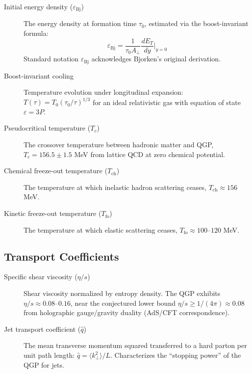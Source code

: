 \documentclass[11pt]{article}
\begin{document}
\begin{description}
\item[Initial energy density ($\varepsilon_{\mathrm{Bj}}$)] The energy density at formation time $\tau_0$, estimated via the boost-invariant formula:
\begin{equation*}
\varepsilon_{\mathrm{Bj}} = \frac{1}{\tau_0 A_\perp} \frac{dE_T}{dy}\bigg|_{y=0}
\end{equation*}
Standard notation $\varepsilon_{\mathrm{Bj}}$ acknowledges Bjorken's original derivation.

\item[Boost-invariant cooling] Temperature evolution under longitudinal expansion: $T(\tau) = T_0(\tau_0/\tau)^{1/3}$ for an ideal relativistic gas with equation of state $\varepsilon = 3P$.

\item[Pseudocritical temperature ($T_c$)] The crossover temperature between hadronic matter and QGP, $T_c = 156.5 \pm 1.5$ MeV from lattice QCD at zero chemical potential.

\item[Chemical freeze-out temperature ($T_{\mathrm{ch}}$)] The temperature at which inelastic hadron scattering ceases, $T_{\mathrm{ch}} \approx 156$ MeV.

\item[Kinetic freeze-out temperature ($T_{\mathrm{fo}}$)] The temperature at which elastic scattering ceases, $T_{\mathrm{fo}} \approx 100$--$120$ MeV.
\end{description}

\subsection*{Transport Coefficients}

\begin{description}
\item[Specific shear viscosity ($\eta/s$)] Shear viscosity normalized by entropy density. The QGP exhibits $\eta/s \approx 0.08$--$0.16$, near the conjectured lower bound $\eta/s \geq 1/(4\pi) \approx 0.08$ from holographic gauge/gravity duality (AdS/CFT correspondence).

\item[Jet transport coefficient ($\hat{q}$)] The mean transverse momentum squared transferred to a hard parton per unit path length: $\hat{q} = \langle k_\perp^2 \rangle/L$. Characterizes the ``stopping power'' of the QGP for jets.
\end{description}
\end{document}
